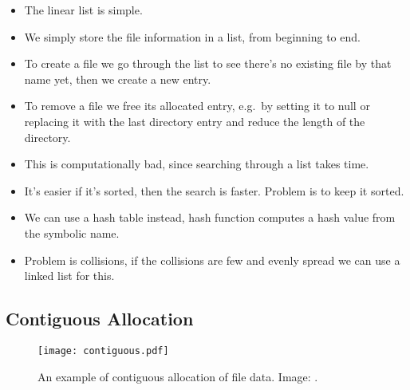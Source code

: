 \documentclass{beamer}
\begin{document}
\begin{frame}{\insertsubsectionhead}
  \begin{itemize}
    \item The linear list is simple.

    \item We simply store the file information in a list, from beginning to 
      end.
      
    \item To create a file we go through the list to see there's no existing 
      file by that name yet, then we create a new entry.

    \item To remove a file we free its allocated entry, e.g.\ by setting it to 
      null or replacing it with the last directory entry and reduce the length 
      of the directory.

  \end{itemize}
\end{frame}

\begin{frame}{\insertsubsectionhead}
  \begin{itemize}
    \item This is computationally bad, since searching through a list takes 
      time.

    \item It's easier if it's sorted, then the search is faster.
      Problem is to keep it sorted.

    \item We can use a hash table instead, hash function computes a hash value 
      from the symbolic name.

    \item Problem is collisions, if the collisions are few and evenly spread we 
      can use a linked list for this.

  \end{itemize}
\end{frame}

\subsection{Contiguous Allocation}

\begin{frame}{\insertsubsectionhead}
  \begin{figure}
    \texttt{[image: contiguous.pdf]}
    \caption{An example of contiguous allocation of file data.
      Image: \cite{Silberschatz2013osc}.}
  \end{figure}
\end{frame}
\end{document}
